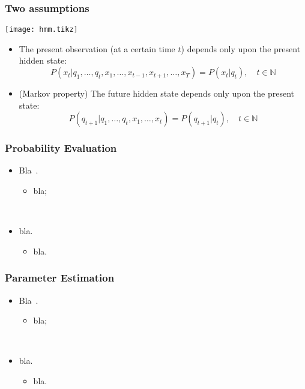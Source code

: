 \documentclass{beamer}
\begin{document}
\begin{frame}
  \frametitle{Two assumptions}

  \centering
  \texttt{[image: hmm.tikz]}

  \begin{itemize}
    \item The present observation (at a certain time $t$) depends only upon the present hidden state:
      \[
        P(x_t|q_1, \dots, q_t, x_1, \dots, x_{t-1},x_{t+1},\dots,x_T) = P(x_t|q_t), \quad t \in \mathbb{N} 
      \]
    \item (Markov property) The future hidden state depends only upon the present state:
      \[
        P(q_{t+1}|q_1, \dots, q_t, x_1, \dots, x_t) = P(q_{t+1}|q_t),\quad t \in \mathbb{N}
      \]
  \end{itemize}
\end{frame}

\begin{frame}
  \frametitle{Probability Evaluation}

  \begin{itemize}
    \item Bla~\cite{rabiner_fundamentals_1993}.
      \begin{itemize}
        \item bla; 
      \end{itemize}
      ~

    \item bla.
      \begin{itemize}
        \item bla.
      \end{itemize}
  \end{itemize}
\end{frame}

\begin{frame}
  \frametitle{Parameter Estimation}

  \begin{itemize}
    \item Bla~\cite{rabiner_fundamentals_1993}.
      \begin{itemize}
        \item bla; 
      \end{itemize}
      ~

    \item bla.
      \begin{itemize}
        \item bla.
      \end{itemize}
  \end{itemize}
\end{frame}
\end{document}
